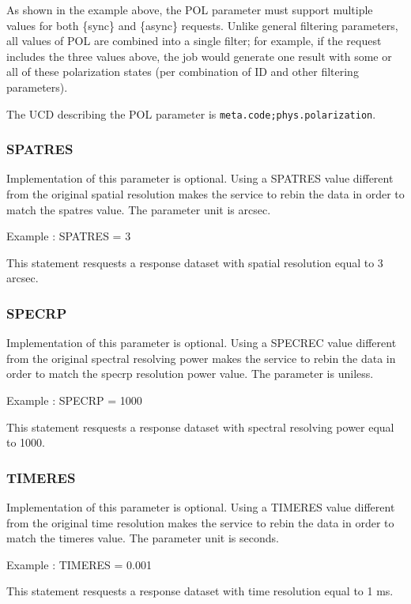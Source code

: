 \documentclass[11pt,a4paper]{ivoa}
\newcommand{\ucd}[1]{\texttt{#1}}
\begin{document}
As shown in the example above, the POL parameter must support multiple values 
for both \{sync\} and \{async\} requests.  Unlike general filtering parameters, 
all values of POL are combined into a single filter; for example, if the request
includes the three values above, the job would generate one result with
some or all of these polarization states (per combination of ID and
other filtering parameters).

The UCD  describing the POL parameter is
\ucd{meta.code;phys.polarization}.

\subsubsection{SPATRES}


Implementation of this parameter is optional. Using a SPATRES value different from the original spatial resolution makes the service to rebin the data in order to match the spatres value. The parameter unit is arcsec.  

Example : SPATRES = 3  

This statement resquests a response dataset with spatial resolution equal to 3 arcsec.

\subsubsection{SPECRP}

Implementation of this parameter is optional. Using a SPECREC value different from the original spectral resolving power makes the service to rebin the data in order to match the specrp resolution power value. The parameter is uniless.  

Example : SPECRP = 1000  

This statement resquests a response dataset with spectral resolving power  equal to 1000.

\subsubsection{TIMERES}

Implementation of this parameter is optional. Using a TIMERES value different from the original time resolution  makes the service to rebin the data in order to match the timeres value. The parameter unit is seconds.  

Example : TIMERES = 0.001  

This statement resquests a response dataset with time resolution equal to 1 ms.
\end{document}
